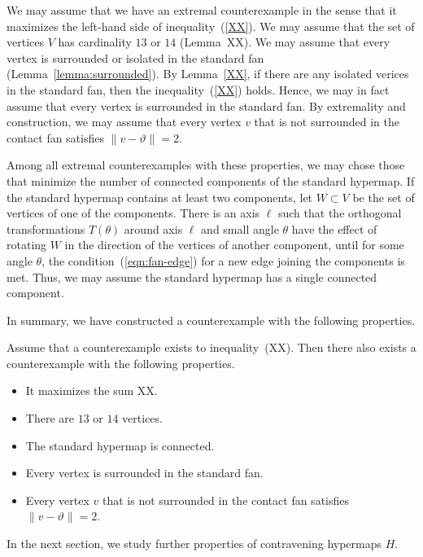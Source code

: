 We may assume that we have an extremal counterexample
in the sense that it maximizes the left-hand side of inequality~(\ref{XX}).  We may assume that the set of vertices $V$ has cardinality $13$ or $14$ (Lemma~{XX}).
We may assume that every vertex is surrounded or isolated in
the standard fan (Lemma~\ref{lemma:surrounded}).  By Lemma~\ref{XX}, if there are any isolated verices in the standard fan, then the inequality~(\ref{XX}) holds.  Hence, we may in fact assume that every vertex is surrounded in the standard fan.
By extremality and construction, we may assume that every vertex $v$ that is not surrounded in the contact fan satisfies $\|v-\vartheta\|=2$.

Among all extremal counterexamples with these properties,
we may chose those that minimize the number of connected components
of the standard hypermap.
If the standard hypermap contains at least two components, let $W\subset V$ be the set of vertices of one of the components.  There is an axis $\ell$ such that the orthogonal transformations $T(\theta)$ around axis $\ell$ and small angle $\theta$  have the effect of rotating $W$ in the direction of the vertices of another component, until for some angle $\theta$, the condition~(\ref{eqn:fan-edge}) for
a new edge joining the components is met.  Thus, we may assume the standard hypermap has a single connected component.

In summary, we have constructed a counterexample with the following properties.

\begin{lemma} Assume that a counterexample exists to inequality~(XX).  Then there also exists a counterexample with the following properties.
\begin{itemize}
\item It maximizes the sum XX.
\item There are $13$ or $14$ vertices.
\item The standard hypermap is connected.
\item Every vertex is surrounded in the standard fan.
\item Every vertex $v$ that is not surrounded in the contact
fan satisfies $\|v-\vartheta\|=2$.
\end{itemize}
\end{lemma}







In the next section, we study further properties of contravening hypermaps $H$.





